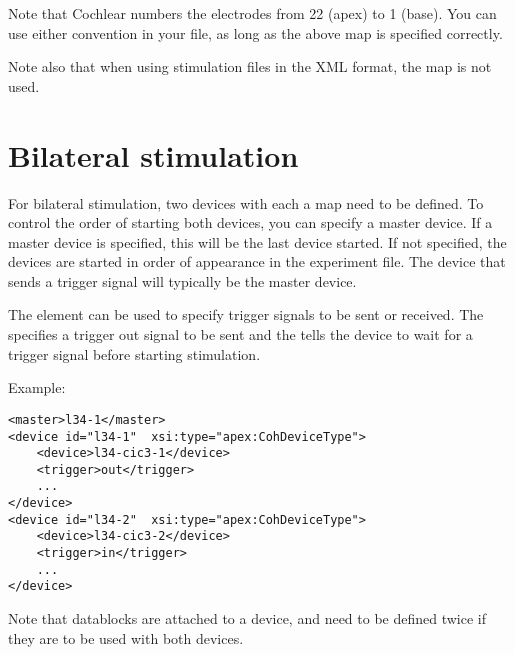 Note that Cochlear numbers the electrodes from 22 (apex) to 1 (base). You can use either convention in your  file, as long as the above map is specified correctly.

Note also that when using stimulation files in the XML format, the map is not used.






\section{Bilateral stimulation}
For bilateral stimulation, two devices with each a map need to be defined.
To control the order of starting both devices, you can specify a master device. If a master device is specified, this will be the last device started. If not specified, the devices are started in order of appearance in the experiment file. The device that sends a trigger signal will typically be the master device.

The  element can be used to specify trigger signals to be sent or received. The  specifies a trigger out signal to be sent and the  tells the device to wait for a trigger signal before starting stimulation.

Example:
\begin{lstlisting}
<master>l34-1</master>
<device id="l34-1"  xsi:type="apex:CohDeviceType">
	<device>l34-cic3-1</device>
	<trigger>out</trigger>
	...
</device>
<device id="l34-2"  xsi:type="apex:CohDeviceType">
	<device>l34-cic3-2</device>
	<trigger>in</trigger>
	...
</device>
\end{lstlisting}



Note that datablocks are attached to a device, and need to be defined twice if they are to be used with both devices.


